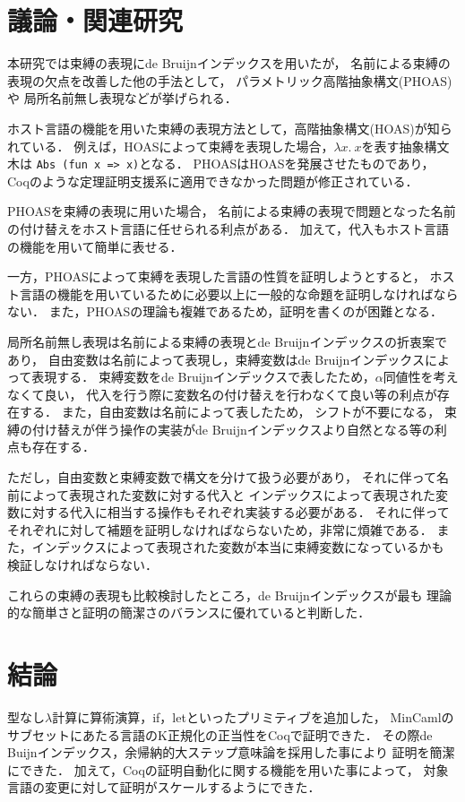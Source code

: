 \documentclass{sumiilab-paper}
\begin{document}
\chapter{議論・関連研究}
本研究では束縛の表現にde Bruijnインデックスを用いたが，
名前による束縛の表現の欠点を改善した他の手法として，
パラメトリック高階抽象構文(PHOAS)\cite{Chlipala:2008:PHA:1411204.1411226}や
局所名前無し表現\cite{chargueraud-11-ln}などが挙げられる．

ホスト言語の機能を用いた束縛の表現方法として，高階抽象構文(HOAS)が知られている．
例えば，HOASによって束縛を表現した場合，$\lambda x.~x$を表す抽象構文木は
\lstinline|Abs (fun x => x)|となる．
PHOASはHOASを発展させたものであり，
Coqのような定理証明支援系に適用できなかった問題が修正されている．

PHOASを束縛の表現に用いた場合，
名前による束縛の表現で問題となった名前の付け替えをホスト言語に任せられる利点がある．
加えて，代入もホスト言語の機能を用いて簡単に表せる．

一方，PHOASによって束縛を表現した言語の性質を証明しようとすると，
ホスト言語の機能を用いているために必要以上に一般的な命題を証明しなければならない．
また，PHOASの理論も複雑であるため，証明を書くのが困難となる．

局所名前無し表現は名前による束縛の表現とde Bruijnインデックスの折衷案であり，
自由変数は名前によって表現し，束縛変数はde Bruijnインデックスによって表現する．
束縛変数をde Bruijnインデックスで表したため，$\alpha$同値性を考えなくて良い，
代入を行う際に変数名の付け替えを行わなくて良い等の利点が存在する．
また，自由変数は名前によって表したため，
シフトが不要になる，
束縛の付け替えが伴う操作の実装がde Bruijnインデックスより自然となる等の利点も存在する．

ただし，自由変数と束縛変数で構文を分けて扱う必要があり，
それに伴って名前によって表現された変数に対する代入と
インデックスによって表現された変数に対する代入に相当する操作もそれぞれ実装する必要がある．
それに伴ってそれぞれに対して補題を証明しなければならないため，非常に煩雑である．
また，インデックスによって表現された変数が本当に束縛変数になっているかも
検証しなければならない．

これらの束縛の表現も比較検討したところ，de Bruijnインデックスが最も
理論的な簡単さと証明の簡潔さのバランスに優れていると判断した．

\chapter{結論}
型なし$\lambda$計算に算術演算，if，letといったプリミティブを追加した，
MinCamlのサブセットにあたる言語のK正規化の正当性をCoqで証明できた．
その際de Buijnインデックス，余帰納的大ステップ意味論を採用した事により
証明を簡潔にできた．
加えて，Coqの証明自動化に関する機能を用いた事によって，
対象言語の変更に対して証明がスケールするようにできた．
\end{document}
